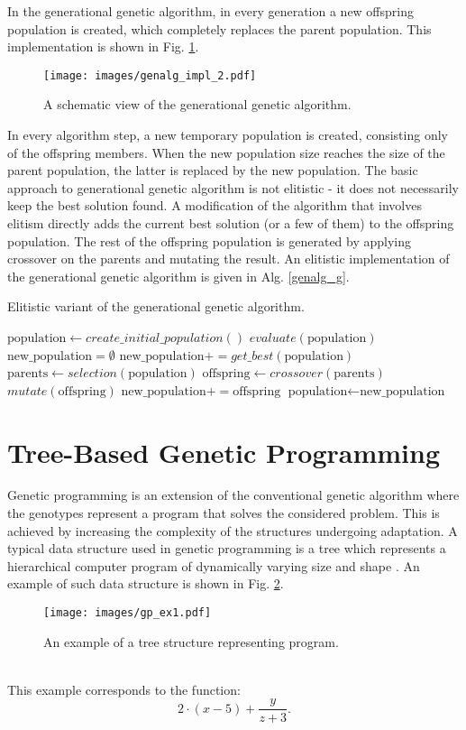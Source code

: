 In the generational genetic algorithm, in every generation a new offspring population is created, which completely replaces the parent population.
This implementation is shown in Fig. \ref{genalg:impl_2}.
\begin{figure}[ht]
    \centering
    \texttt{[image: images/genalg\_impl\_2.pdf]}
    \caption{A schematic view of the generational genetic algorithm.}
    \label{genalg:impl_2}
\end{figure}
In every algorithm step, a new temporary population is created, consisting only of the offspring members.
When the new population size reaches the size of the parent population, the latter is replaced by the new population.
The basic approach to generational genetic algorithm is not elitistic - it does not necessarily keep the best solution found. 
A modification of the algorithm that involves elitism directly adds the current best solution (or a few of them) to the offspring population.
The rest of the offspring population is generated by applying crossover on the parents and mutating the result.
An elitistic implementation of the generational genetic algorithm is given in Alg.
 \ref{genalg_g}.
\begin{algorithm}
\caption{Elitistic variant of the generational genetic algorithm.\label{genalg_g}}
\begin{algorithmic}[1]
\State $\text{population} \gets create\_initial\_population()$
\State $evaluate(\text{population})$
\State $\text{new\_population} = \emptyset$
\State $\text{new\_population} += get\_best(\text{population})$
\State $\text{parents} \gets selection(\text{population})$
\State $\text{offspring} \leftarrow crossover(\text{parents})$
\State $mutate(\text{offspring})$
\State $\text{new\_population} += \text{offspring}$
\EndWhile
\State $\text{population} \leftarrow \text{new\_population}$
\EndWhile
\end{algorithmic}
\end{algorithm}

\section{Tree-Based Genetic Programming}
Genetic programming is an extension of the conventional genetic algorithm where the genotypes represent a program that solves the considered problem.
This is achieved by increasing the complexity of the structures undergoing adaptation.
A typical data structure used in genetic programming is a tree which represents a hierarchical computer program of dynamically varying size and shape \cite{koza1992genetic}.
An example of such data structure is shown in Fig. \ref{genprog:ex1}.
\begin{figure}[ht]
    \centering
    \texttt{[image: images/gp\_ex1.pdf]}
    \caption{An example of a tree structure representing program.}
    \label{genprog:ex1}
\end{figure}
\\This example corresponds to the function:
\begin{equation*}
2 \cdot (x-5) + \frac{y}{z + 3}.
\end{equation*}


